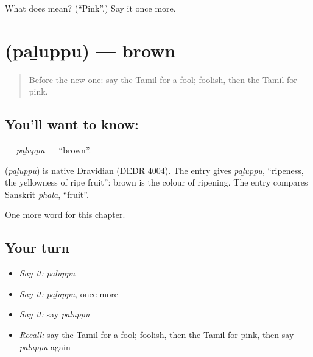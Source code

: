 \begin{tcolorbox}[breakable,colback=teal!4,colframe=teal!35!black,title={Before you move on}]
What does  mean? (\textquotedblleft{}Pink\textquotedblright{}.) Say it once more.
\end{tcolorbox}
\section[\texorpdfstring{\ta{பழுப்பு} (paḻuppu)}{பழுப்பு (paḻuppu)}]{ (paḻuppu) — brown}

\label{lesson:TA-C211-paluppu}



\begin{quote}
Before the new one: say the Tamil for a fool; foolish, then the Tamil for pink.
\end{quote}

\subsection*{You'll want to know: }
\textbf{} — \emph{paḻuppu} — \textquotedblleft{}brown\textquotedblright{}.

\begin{cousinweb}
\textbf{} (\emph{paḻuppu}) is native Dravidian (DEDR 4004). The entry gives \emph{paḻuppu}, \textquotedblleft{}ripeness, the yellowness of ripe fruit\textquotedblright{}: brown is the colour of ripening. The entry compares Sanskrit \emph{phala}, \textquotedblleft{}fruit\textquotedblright{}.
\end{cousinweb}

\begin{grammarlens}[title={What you've built}]
One more word for this chapter.
\end{grammarlens}

\subsection*{Your turn}
\begin{itemize}
\raggedright
  \item \emph{Say it:} \emph{paḻuppu}
  \item \emph{Say it:} \emph{paḻuppu}, once more
  \item \emph{Say it:} say \emph{paḻuppu}
  \item \emph{Recall:} say the Tamil for a fool; foolish, then the Tamil for pink, then say \emph{paḻuppu} again
\end{itemize}

